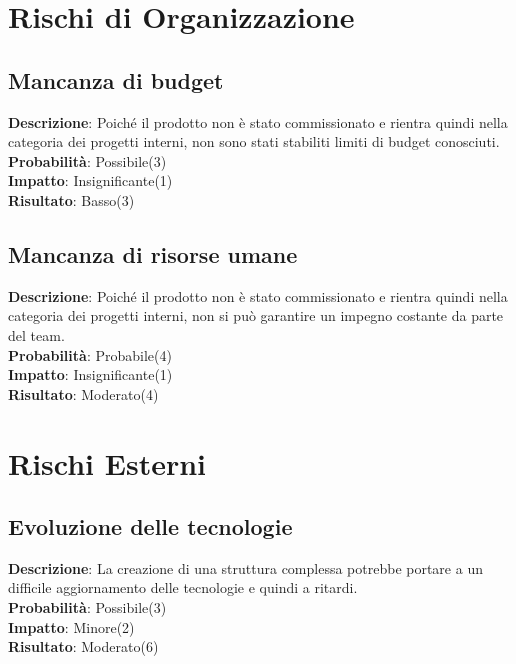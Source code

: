 \documentclass[12pt, a4paper]{article}
\begin{document}
\section{Rischi di Organizzazione}
\subsection{Mancanza di budget}
\textbf{Descrizione}: Poiché il prodotto non è stato commissionato e rientra quindi nella categoria dei progetti interni, non sono stati stabiliti limiti di budget conosciuti.\\
\textbf{Probabilità}: Possibile(3)\\
\textbf{Impatto}: Insignificante(1)\\
\textbf{Risultato}: Basso(3)\\

\subsection{Mancanza di risorse umane}
\textbf{Descrizione}: Poiché il prodotto non è stato commissionato e rientra quindi nella categoria dei progetti interni, non si può garantire un impegno costante da parte del team.\\
\textbf{Probabilità}: Probabile(4)\\
\textbf{Impatto}: Insignificante(1)\\
\textbf{Risultato}: Moderato(4)\\

\section{Rischi Esterni}
\subsection{Evoluzione delle tecnologie}
\textbf{Descrizione}: La creazione di una struttura complessa potrebbe portare a un difficile aggiornamento delle tecnologie e quindi a ritardi.\\
\textbf{Probabilità}: Possibile(3)\\
\textbf{Impatto}: Minore(2)\\
\textbf{Risultato}: Moderato(6)\\
\end{document}
